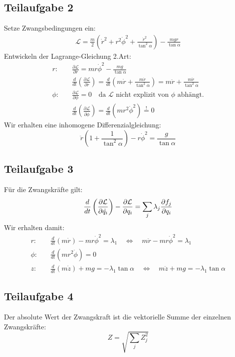 \documentclass[a4paper,german,12pt,smallheadings]{scrartcl}
\begin{document}
\subsection*{Teilaufgabe 2}
Setze Zwangsbedingungen ein:
\begin{align*}
\mathcal{L}=\frac{m}{2} \left(\dot{r}^2+r^2\dot{\phi}^2+\frac{\dot{r}^2}{\tan^2 \alpha}\right)-\frac{mgr}{\tan \alpha}
\end{align*}
Entwickeln der Lagrange-Gleichung 2.Art:
\begin{align*}
r: & \quad \frac{\partial \mathcal{L}}{\partial r}=mr\dot{\phi}^2-\frac{mg}{\tan \alpha}\\
& \quad \frac{d}{dt}\left(\frac{\partial \mathcal{L}}{\partial \dot{r}}\right)=\frac{d}{dt}\left(m\dot{r}+\frac{m\dot{r}}{\tan^2 \alpha}\right)=m \ddot{r}+\frac{m \ddot{r}}{\tan^2 \alpha}\\
\phi: & \quad \frac{\partial \mathcal{L}}{\partial \phi}=0 \quad \text{da $\mathcal{L}$ nicht explizit von $\phi$ abhängt.}\\
& \quad \frac{d}{dt}\left(\frac{\partial \mathcal{L}}{\partial \dot{\phi}}\right)=\frac{d}{dt}\left(mr^2\dot{\phi}^2\right)\overset{!}{=}0
\end{align*}
Wir erhalten eine inhomogene Differenzialgleichung:
\begin{equation*}
\ddot{r} \left(1+\frac{1}{\tan^2 \alpha}\right)-r\dot{\phi}^2=\frac{g}{\tan \alpha}
\end{equation*}

\subsection*{Teilaufgabe 3}

Für die Zwangskräfte gilt:
\begin{equation*}
\frac{d}{dt}\left(\frac{\partial \mathcal{L}}{\partial \dot{q_i}}\right)-\frac{\partial \mathcal{L}}{\partial q_i}=\sum\limits_j \lambda_j \frac{\partial f_j}{\partial q_i}\\
\end{equation*}
Wir erhalten damit:
\begin{align*}
r: & \quad \frac{d}{dt}\left(m\dot{r}\right)-mr\dot{\phi}^2=\lambda_1 \quad \Leftrightarrow \quad m\ddot{r}-mr\dot{\phi}^2=\lambda_1\\
\phi: & \quad \frac{d}{dt}\left(mr^2\dot{\phi}\right)=0\\
z: & \quad \frac{d}{dt}\left(m\dot{z}\right)+mg=-\lambda_1 \tan \alpha \quad \Leftrightarrow \quad m\ddot{z}+mg=-\lambda_1 \tan \alpha
\end{align*}

\subsection*{Teilaufgabe 4}
Der absolute Wert der Zwangskraft ist die vektorielle Summe der einzelnen Zwangskräfte:
\begin{equation*}
Z=\sqrt{\sum \limits_j Z_j^2}
\end{equation*}
\end{document}
